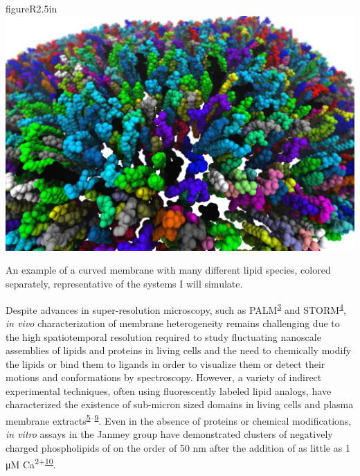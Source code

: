 \documentclass[11pt,notitlepage]{article}
\begin{document}
\begin{wrapfloat}{figure}{R}{2.5in}
\centering
\includegraphics{content/images/membrane-vmd.png}
\caption{An example of a curved membrane with many different lipid
species, colored separately, representative of the systems I will
simulate.}
\label{fig:membrane-setup}
\end{wrapfloat}

Despite advances in super-resolution microscopy, such as
PALM\textsuperscript{\protect\hyperlink{ref-mNNsAL8U}{3}} and
STORM\textsuperscript{\protect\hyperlink{ref-12fkuxySq}{4}}, \emph{in
vivo} characterization of membrane heterogeneity remains challenging due
to the high spatiotemporal resolution required to study fluctuating
nanoscale assemblies of lipids and proteins in living cells and the need
to chemically modify the lipids or bind them to ligands in order to
visualize them or detect their motions and conformations by
spectroscopy. However, a variety of indirect experimental techniques,
often using fluorescently labeled lipid analogs, have characterized the
existence of sub-micron sized domains in living cells and plasma
membrane
extracts\textsuperscript{\protect\hyperlink{ref-GGtK2c0N}{5}--\protect\hyperlink{ref-aiu6Tmil}{9}}.
Even in the absence of proteins or chemical modifications, \emph{in
vitro} assays in the Janmey group have demonstrated clusters of
negatively charged phospholipids of on the order of 50 nm after the
addition of as little as 1 μM
Ca\textsuperscript{2+}\textsuperscript{\protect\hyperlink{ref-LhOwGz4k}{10}}.
\end{document}
